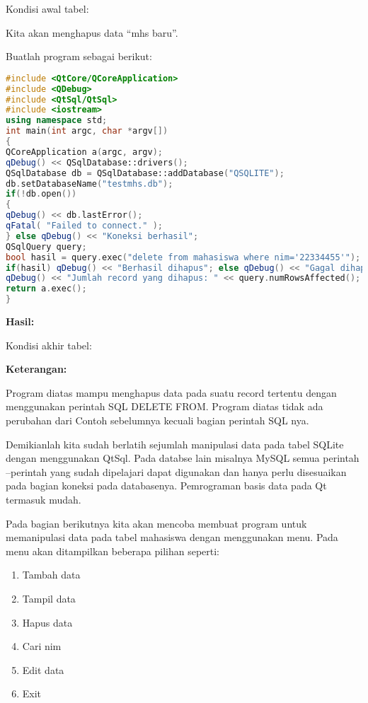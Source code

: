 Kondisi awal tabel:

Kita akan menghapus data ``mhs baru''.

Buatlah program sebagai berikut:

\begin{lstlisting}[language=c++, caption= Menghapus data pada SQLite]
#include <QtCore/QCoreApplication>
#include <QDebug>
#include <QtSql/QtSql>
#include <iostream>
using namespace std;
int main(int argc, char *argv[])
{
QCoreApplication a(argc, argv);
qDebug() << QSqlDatabase::drivers();
QSqlDatabase db = QSqlDatabase::addDatabase("QSQLITE");
db.setDatabaseName("testmhs.db");
if(!db.open())
{
qDebug() << db.lastError();
qFatal( "Failed to connect." );
} else qDebug() << "Koneksi berhasil";
QSqlQuery query;
bool hasil = query.exec("delete from mahasiswa where nim='22334455'");
if(hasil) qDebug() << "Berhasil dihapus"; else qDebug() << "Gagal dihapus";
qDebug() << "Jumlah record yang dihapus: " << query.numRowsAffected();
return a.exec();
}
\end{lstlisting}

\textbf{Hasil:}

Kondisi akhir tabel:

\textbf{Keterangan:}

Program diatas mampu menghapus data pada suatu record tertentu dengan
menggunakan perintah SQL DELETE FROM. Program diatas tidak ada perubahan
dari Contoh sebelumnya kecuali bagian perintah SQL nya.

Demikianlah kita sudah berlatih sejumlah manipulasi data pada tabel
SQLite dengan menggunakan QtSql. Pada databse lain misalnya MySQL semua
perintah --perintah yang sudah dipelajari dapat digunakan dan hanya
perlu disesuaikan pada bagian koneksi pada databasenya. Pemrograman
basis data pada Qt termasuk mudah.

Pada bagian berikutnya kita akan mencoba membuat program untuk
memanipulasi data pada tabel mahasiswa dengan menggunakan menu. Pada
menu akan ditampilkan beberapa pilihan seperti:

\begin{enumerate}


\item
  Tambah data
\item
  Tampil data
\item
  Hapus data
\item
  Cari nim
\item
  Edit data
\item
  Exit
\end{enumerate}

